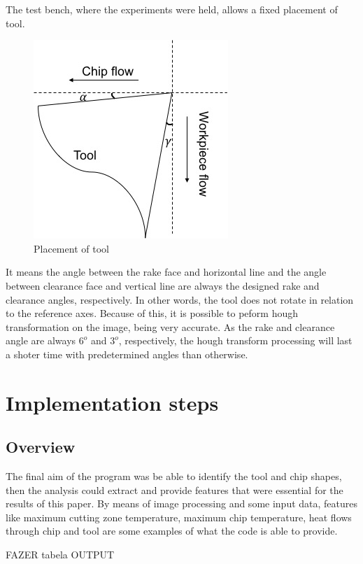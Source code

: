 	The test bench, where the experiments were held, allows a fixed placement of tool.

	\begin{figure}[H]
		\centering
		\captionsetup{justification=centering}
		\includegraphics[scale = 0.65]{Cap4/imgset.jpg}
		\caption{Placement of tool}
		\label{fig:imgset}
	\end{figure}

	It means the angle between the rake face and horizontal line and the angle between clearance face and vertical line are always the designed rake and clearance angles, respectively. In other words, the tool does not rotate in relation to the reference axes. Because of this, it is possible to peform hough transformation on the image, being very accurate. As the rake and clearance angle are always $6^{o}$ and $3^{o}$, respectively, the hough transform processing will last a shoter time with predetermined angles than otherwise.

\section{Implementation steps}
	\subsection{Overview}	

	The final aim of the program was be able to identify the tool and chip shapes, then the analysis could extract and provide features that were essential for the results of this paper. By means of image processing and some input data, features like maximum cutting zone temperature, maximum chip temperature, heat flows through chip and tool are some examples of what the code is able to provide.	

	FAZER tabela OUTPUT
